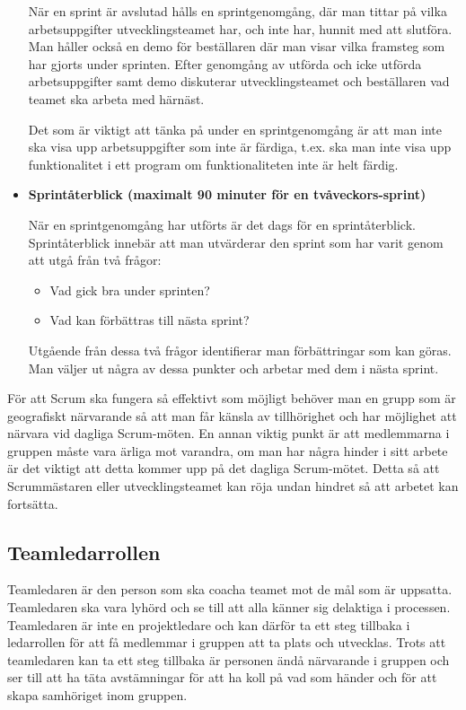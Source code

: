 \begin{itemize}
	När en sprint är avslutad hålls en sprintgenomgång, där man tittar på vilka arbetsuppgifter utvecklingsteamet har, och inte har, hunnit med att slutföra. Man håller också en demo för beställaren där man visar vilka framsteg som har gjorts under sprinten. Efter genomgång av utförda och icke utförda arbetsuppgifter samt demo diskuterar utvecklingsteamet och beställaren vad teamet ska arbeta med härnäst.
	 
Det som är viktigt att tänka på under en sprintgenomgång är att man inte ska visa upp arbetsuppgifter som inte är färdiga, t.ex. ska man inte visa upp funktionalitet i ett program om funktionaliteten inte är helt färdig.

\item \textbf{Sprintåterblick (maximalt 90 minuter för en tvåveckors-sprint)}

När en sprintgenomgång har utförts är det dags för en sprintåterblick. Sprintåterblick innebär att man utvärderar den sprint som har varit genom att utgå från två frågor:

\begin{itemize}
	\item Vad gick bra under sprinten?
	\item Vad kan förbättras till nästa sprint?
\end{itemize}

Utgående från dessa två frågor identifierar man förbättringar som kan göras. Man väljer ut några av dessa punkter och arbetar med dem i nästa sprint.

\end{itemize}

För att Scrum ska fungera så effektivt som möjligt behöver man en grupp som är geografiskt närvarande så att man får känsla av tillhörighet och har möjlighet att närvara vid dagliga Scrum-möten. En annan viktig punkt är att medlemmarna i gruppen måste vara ärliga mot varandra, om man har några hinder i sitt arbete är det viktigt att detta kommer upp på det dagliga Scrum-mötet. Detta så att Scrummästaren eller utvecklingsteamet kan röja undan hindret så att arbetet kan fortsätta.

\subsection{Teamledarrollen}
Teamledaren är den person som ska coacha teamet mot de mål som är uppsatta. Teamledaren ska vara lyhörd och se till att alla känner sig delaktiga i processen. Teamledaren är inte en projektledare och kan därför ta ett steg tillbaka i ledarrollen för att få medlemmar i gruppen att ta plats och utvecklas.\cite{teamledare} Trots att teamledaren kan ta ett steg tillbaka är personen ändå närvarande i gruppen och ser till att ha täta avstämningar för att ha koll på vad som händer och för att skapa samhöriget inom gruppen.\cite{teamguide}

